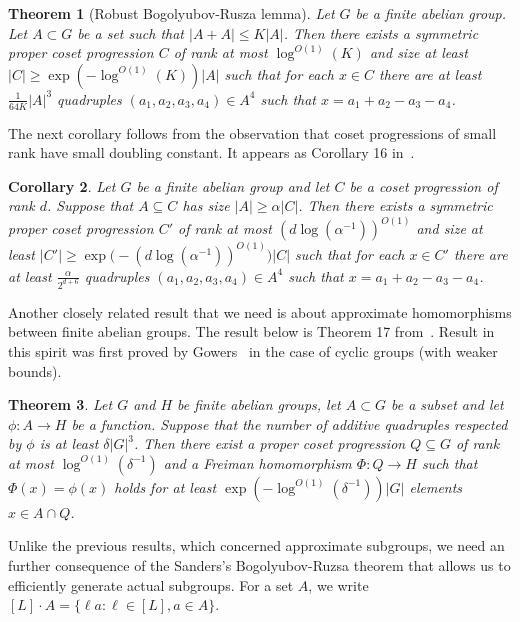 \documentclass[a4paper,11pt]{article}
\newtheorem{theorem}{Theorem}
\numberwithin{theorem}{section}
\newtheorem{corollary}[theorem]{Corollary}
\theoremstyle{definition}
\begin{document}
\begin{theorem}[Robust Bogolyubov-Rusza lemma]\label{robustBogRuzsa}Let $G$ be a finite abelian group. Let $A \subset G$ be a set such that $|A + A| \leq K |A|$. Then there exists a symmetric proper coset progression $C$ of rank at most $\log^{O(1)} (K)$ and size at least $|C| \geq \exp(-\log^{O(1)} (K))|A|$ such that for each $x \in C$ there are at least $\frac{1}{64K}|A|^3$ quadruples $(a_1, a_2, a_3, a_4) \in A^4$ such that $x = a_1 + a_2 - a_3 - a_4$.\end{theorem}

The next corollary follows from the observation that coset progressions of small rank have small doubling constant. It appears as Corollary 16 in~\cite{generalBilBog}. 

\begin{corollary}\label{robustBogRuzsaCP}Let $G$ be a finite abelian group and let $C$ be a coset progression of rank $d$. Suppose that $A \subseteq C$ has size $|A| \geq \alpha |C|$. Then there exists a symmetric proper coset progression $C'$ of rank at most $(d\log (\alpha^{-1}))^{O(1)}$ and size at least $|C'| \geq  \exp\Big(-(d\log (\alpha^{-1}))^{O(1)}\Big) |C|$ such that for each $x \in C'$ there are at least $\frac{\alpha}{2^{d + 6}}$ quadruples $(a_1, a_2, a_3, a_4) \in A^4$ such that $x = a_1 + a_2 - a_3 - a_4$.\end{corollary}

Another closely related result that we need is about approximate homomorphisms between finite abelian groups. The result below is Theorem 17 from~\cite{generalBilBog}. Result in this spirit was first proved by Gowers~\cite{Gow4AP} in the case of cyclic groups (with weaker bounds).

\begin{theorem}\label{approxFreimanHom}Let $G$ and $H$ be finite abelian groups, let $A \subset G$ be a subset and let $\phi \colon A \to H$ be a function. Suppose that the number of additive quadruples respected by $\phi$ is at least $\delta |G|^3$. Then there exist a proper coset progression $Q \subseteq G$ of rank at most $\log^{O(1)} (\delta^{-1})$ and a Freiman homomorphism $\Phi \colon Q \to H$ such that $\Phi(x) = \phi(x)$ holds for at least $\exp(-\log^{O(1)} (\delta^{-1})) |G|$ elements $x \in A \cap Q$.\end{theorem}

Unlike the previous results, which concerned approximate subgroups, we need an further consequence of the Sanders's Bogolyubov-Ruzsa theorem that allows us to efficiently generate actual subgroups. For a set $A$, we write $[L] \cdot A = \{\ell a: \ell \in [L], a \in A\}$.
\end{document}
